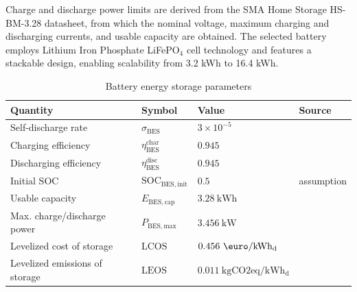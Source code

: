\documentclass[12pt,a4paper]{report}
\begin{document}
Charge and discharge power limits are derived from the SMA Home Storage HS-BM-3.28 datasheet, from which the nominal voltage, maximum charging and discharging currents, and usable capacity are obtained. The selected battery employs Lithium Iron Phosphate LiFePO$_{4}$ cell technology and features a stackable design, enabling scalability from 3.2 kWh to 16.4 kWh. \cite{sma_home_storage_ds}



\begin{table}[H]
\centering
\caption{Battery energy storage parameters}
\label{tab:bess_parameters}
\begin{tabular}{llll}
\hline
Quantity & Symbol & Value & Source \\
\hline
Self-discharge rate & \(\sigma_{\mathrm{BES}}\) & \(3\times10^{-5}\) & \cite{DANGELO2026121627} \\
Charging efficiency & \(\eta_{\mathrm{BES}}^{\mathrm{char}}\) & \(0.945\) & \cite{sma_home_storage_ds} \\
Discharging efficiency & \(\eta_{\mathrm{BES}}^{\mathrm{disc}}\) & \(0.945\) & \cite{sma_home_storage_ds} \\
Initial SOC & \(\mathrm{SOC}_{\mathrm{BES,init}}\) & \(0.5\) & assumption \\
Usable capacity & \(E_{\mathrm{BES,cap}}\) & \(3.28~\mathrm{kWh}\) & \cite{sma_home_storage_ds} \\
Max. charge/discharge power & \(P_{\mathrm{BES,max}}\) & \(3.456~\mathrm{kW}\) & \cite{sma_home_storage_ds} \\
Levelized cost of storage & \(\mathrm{LCOS}\) & \(0.456~\mathrm{\text{\euro}/kWh_{d}}\) & \cite{CRISTEA2022102633} \\
Levelized emissions of storage& \(\mathrm{LEOS}\) & \(0.011~\mathrm{kgCO2eq/kWh_{d}}\) & \cite{BESSLEOS} \\
\hline
\end{tabular}
\end{table}
\end{document}
